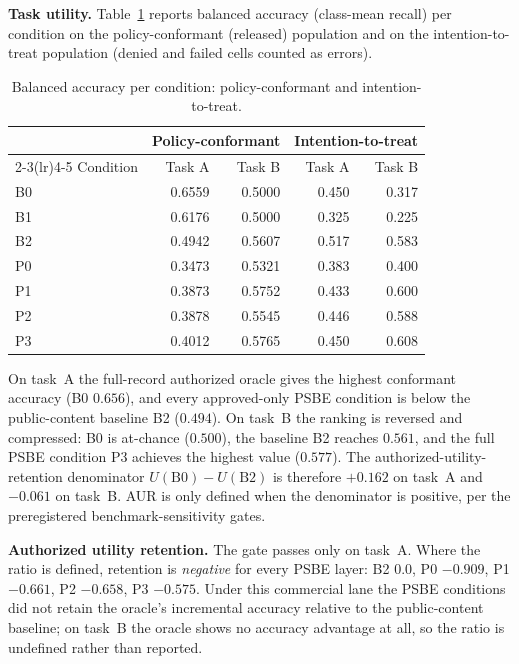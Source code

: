 \noindent \textbf{Task utility.} Table~\ref{tab:matrix_utility} reports balanced
accuracy (class-mean recall) per condition on the policy-conformant (released)
population and on the intention-to-treat population (denied and failed cells
counted as errors).

\begin{table}[t]
\centering
\caption{Balanced accuracy per condition: policy-conformant and
intention-to-treat.}
\label{tab:matrix_utility}
\small
\begin{tabular}{lrr|rr}
\toprule
& \multicolumn{2}{c}{Policy-conformant} & \multicolumn{2}{c}{Intention-to-treat} \\
\cmidrule(lr){2-3}\cmidrule(lr){4-5}
Condition & Task A & Task B & Task A & Task B \\
\midrule
B0 & 0.6559 & 0.5000 & 0.450 & 0.317 \\
B1 & 0.6176 & 0.5000 & 0.325 & 0.225 \\
B2 & 0.4942 & 0.5607 & 0.517 & 0.583 \\
P0 & 0.3473 & 0.5321 & 0.383 & 0.400 \\
P1 & 0.3873 & 0.5752 & 0.433 & 0.600 \\
P2 & 0.3878 & 0.5545 & 0.446 & 0.588 \\
P3 & 0.4012 & 0.5765 & 0.450 & 0.608 \\
\bottomrule
\end{tabular}
\end{table}

On task~A the full-record authorized oracle gives the highest conformant accuracy
(B0 \(0.656\)), and every approved-only PSBE condition is below the public-content
baseline B2 (\(0.494\)). On task~B the ranking is reversed and compressed: B0 is
at-chance (\(0.500\)), the baseline B2 reaches \(0.561\), and the full PSBE
condition P3 achieves the highest value (\(0.577\)). The authorized-utility-
retention denominator \(U(\text{B0})-U(\text{B2})\) is therefore \(+0.162\) on
task~A and \(-0.061\) on task~B. AUR is only defined when the denominator is
positive, per the preregistered benchmark-sensitivity gates.

\textbf{Authorized utility retention.} The gate passes only on task~A. Where the
ratio is defined, retention is \emph{negative} for every PSBE layer: B2 \(0.0\),
P0 \(-0.909\), P1 \(-0.661\), P2 \(-0.658\), P3 \(-0.575\). Under this commercial
lane the PSBE conditions did not retain the oracle's incremental accuracy
relative to the public-content baseline; on task~B the oracle shows no accuracy
advantage at all, so the ratio is undefined rather than reported.

